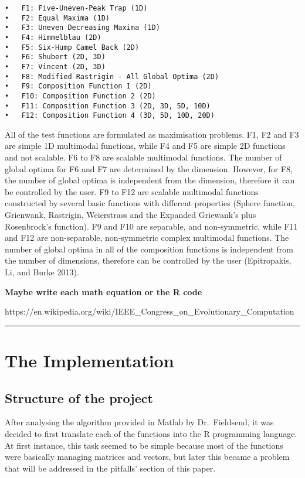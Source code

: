 \documentclass[12pt,a4paper]{article}
\begin{document}
\begin{verbatim}
•   F1: Five-Uneven-Peak Trap (1D)
•   F2: Equal Maxima (1D)
•   F3: Uneven Decreasing Maxima (1D)
•   F4: Himmelblau (2D)
•   F5: Six-Hump Camel Back (2D)
•   F6: Shubert (2D, 3D)
•   F7: Vincent (2D, 3D)
•   F8: Modified Rastrigin - All Global Optima (2D)
•   F9: Composition Function 1 (2D)
•   F10: Composition Function 2 (2D)
•   F11: Composition Function 3 (2D, 3D, 5D, 10D)
•   F12: Composition Function 4 (3D, 5D, 10D, 20D)
\end{verbatim}

All of the test functions are formulated as maximisation problems. F1,
F2 and F3 are simple 1D multimodal functions, while F4 and F5 are simple
2D functions and not scalable. F6 to F8 are scalable multimodal
functions. The number of global optima for F6 and F7 are determined by
the dimension. However, for F8, the number of global optima is
independent from the dimension, therefore it can be controlled by the
user. F9 to F12 are scalable multimodal functions constructed by several
basic functions with different properties (Sphere function, Grienwank,
Rastrigin, Weierstrass and the Expanded Griewank's plus Rosenbrock's
function). F9 and F10 are separable, and non-symmetric, while F11 and
F12 are non-separable, non-symmetric complex multimodal functions. The
number of global optima in all of the composition functions is
independent from the number of dimensions, therefore can be controlled
by the user (Epitropakis, Li, and Burke 2013).

\textbf{Maybe write each math equation or the R code}

https://en.wikipedia.org/wiki/IEEE\_Congress\_on\_Evolutionary\_Computation

\begin{center}\rule{0.5\linewidth}{\linethickness}\end{center}

\section{The Implementation}\label{the-implementation}

\subsection{Structure of the project}\label{structure-of-the-project}

After analysing the algorithm provided in Matlab by Dr.~Fieldsend, it
was decided to first translate each of the functions into the R
programming language. At first instance, this task seemed to be simple
because most of the functions were basically managing matrices and
vectors, but later this became a problem that will be addressed in the
pitfalls' section of this paper.
\end{document}
